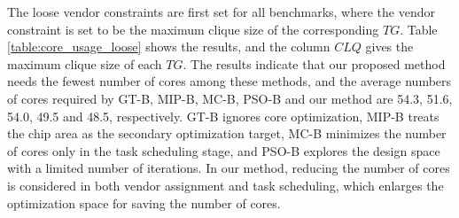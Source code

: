 \documentclass[10pt,journal, compsoc]{IEEEtran}
\begin{document}
The loose vendor constraints are first set for all benchmarks, where the vendor constraint is set to be the maximum clique size of the corresponding $TG$. Table \ref{table:core_usage_loose} shows the results, and the column $CLQ$ gives the maximum clique size of each $TG$. The results indicate that our proposed method needs the fewest number of cores among these methods, and the average numbers of cores required by GT-B, MIP-B, MC-B, PSO-B and our method are 54.3, 51.6, 54.0, 49.5 and 48.5, respectively. GT-B ignores core optimization, MIP-B treats the chip area as the secondary optimization target, MC-B minimizes the number of cores only in the task scheduling stage, and PSO-B explores the design space with a limited number of iterations. In our method, reducing the number of cores is considered in both vendor assignment and task scheduling, which enlarges the optimization space for saving the number of cores.
\end{document}
